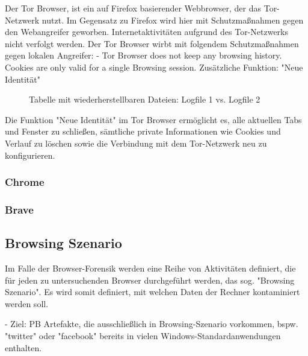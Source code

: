 Der Tor Browser, ist ein auf Firefox basierender Webbrowser, der das Tor-Netzwerk nutzt.
Im Gegensatz zu Firefox wird hier mit Schutzmaßnahmen gegen den Webangreifer geworben.
Internetaktivitäten aufgrund des Tor-Netzwerks nicht verfolgt werden.
Der Tor Browser wirbt mit folgendem Schutzmaßnahmen gegen lokalen Angreifer:
- Tor Browser does not keep any browsing history. Cookies are only valid for a single Browsing session.
Zusätzliche Funktion: "Neue Identität"
\begin{figure}[h!]
	\caption{Tabelle mit wiederherstellbaren Dateien: Logfile 1 vs. Logfile 2}
\end{figure}
Die Funktion "Neue Identität" im Tor Browser ermöglicht es, alle aktuellen Tabs und Fenster zu schließen, sämtliche private Informationen wie Cookies und Verlauf zu löschen sowie die Verbindung mit dem Tor-Netzwerk neu zu konfigurieren.

\subsubsection*{Chrome}

\subsubsection*{Brave}

\subsection{Browsing Szenario}

Im Falle der Browser-Forensik werden eine Reihe von Aktivitäten definiert, die für jeden zu untersuchenden Browser durchgeführt werden, das sog. "Browsing Szenario".
Es wird somit definiert, mit welchen Daten der Rechner kontaminiert werden soll.

- Ziel: PB Artefakte, die ausschließlich in Browsing-Szenario vorkommen, bspw. "twitter" oder "facebook" bereits in vielen Windows-Standardanwendungen enthalten.

